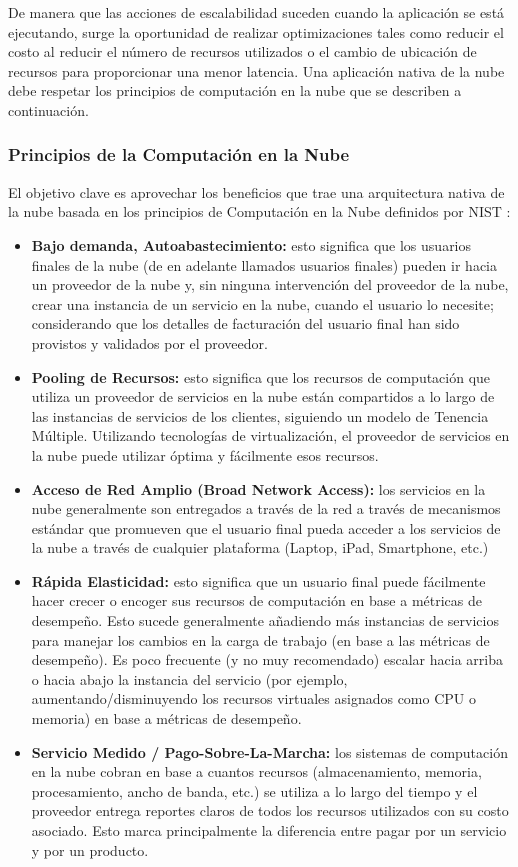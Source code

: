     De manera que las acciones de escalabilidad suceden cuando la aplicación se está ejecutando, surge la oportunidad de realizar optimizaciones tales como reducir el costo al reducir el número de recursos utilizados o el cambio de ubicación de recursos para proporcionar una menor latencia. Una aplicación nativa de la nube debe respetar los principios de computación en la nube que se describen a continuación.
	
        \subsubsection{Principios de la Computación en la Nube}
        El objetivo clave es aprovechar los beneficios que trae una arquitectura nativa de la nube basada en los principios de Computación en la Nube definidos por NIST \cite{Mell2011-wz}:
        \begin{itemize}
            \item \textbf{Bajo demanda, Autoabastecimiento:} esto significa que los usuarios finales de la nube (de en adelante llamados usuarios finales) pueden ir hacia un proveedor de la nube y, sin ninguna intervención del proveedor de la nube, crear una instancia de un servicio en la nube,  cuando el usuario lo necesite; considerando que los detalles de facturación del usuario final han sido provistos y validados por el proveedor.
            \item \textbf{Pooling de Recursos:} esto significa que los recursos de computación que utiliza un proveedor de servicios en la nube están compartidos a lo largo de las instancias de servicios de los clientes, siguiendo un modelo de Tenencia Múltiple. Utilizando tecnologías de virtualización, el proveedor de servicios en la nube puede utilizar óptima y fácilmente esos recursos. 
            \item \textbf{Acceso de Red Amplio (Broad Network Access):} los servicios en la nube generalmente son entregados a través de la red a través de mecanismos estándar que promueven que el usuario final pueda acceder a los servicios de la nube a través de cualquier plataforma (Laptop, iPad, Smartphone, etc.)
            \item \textbf{Rápida Elasticidad:} esto significa que un usuario final puede fácilmente hacer crecer o encoger sus recursos de computación en base a métricas de desempeño. Esto sucede generalmente añadiendo más instancias de servicios para manejar los cambios en la carga de trabajo (en base a las métricas de desempeño). Es poco frecuente (y no muy recomendado) escalar hacia arriba o hacia abajo la instancia del servicio (por ejemplo, aumentando/disminuyendo los recursos virtuales asignados como CPU o memoria) en base a métricas de desempeño.
            \item \textbf{Servicio Medido / Pago-Sobre-La-Marcha:}  los sistemas de computación en la nube cobran en base a cuantos recursos (almacenamiento, memoria, procesamiento, ancho de banda, etc.) se utiliza a lo largo del tiempo y el proveedor entrega reportes claros de todos los recursos utilizados con su costo asociado. Esto marca principalmente la diferencia entre pagar por un servicio y por un producto.
        \end{itemize}
        
